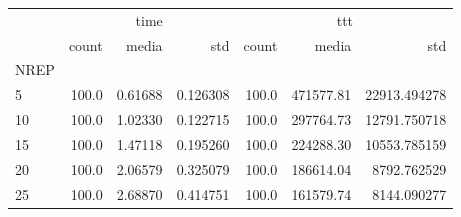 \begin{tabular}{lrrrrrr}
\toprule
{} & \multicolumn{3}{c}{time} & \multicolumn{3}{c}{ttt} \\
{} &  count &    media &       std &  count &      media &           std \\
NREP &        &          &           &        &            &               \\
\midrule
5    &  100.0 &  0.61688 &  0.126308 &  100.0 &  471577.81 &  22913.494278 \\
10   &  100.0 &  1.02330 &  0.122715 &  100.0 &  297764.73 &  12791.750718 \\
15   &  100.0 &  1.47118 &  0.195260 &  100.0 &  224288.30 &  10553.785159 \\
20   &  100.0 &  2.06579 &  0.325079 &  100.0 &  186614.04 &   8792.762529 \\
25   &  100.0 &  2.68870 &  0.414751 &  100.0 &  161579.74 &   8144.090277 \\
\bottomrule
\end{tabular}
